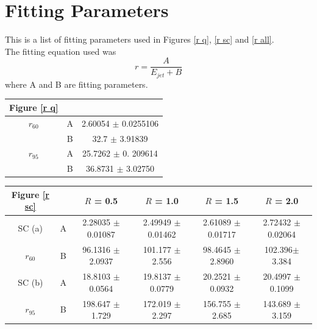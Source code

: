 \documentclass[a4paper,11pt, onecolumn]{article}
\begin{document}
  \hspace{1in}

  \newpage \newpage

  \section{Fitting Parameters} \label{fittings}


  This is a list of fitting parameters used in Figures \ref{r q}, \ref{r sc} and \ref{r all}. \\
  The fitting equation used was 
  \begin{equation}
    r = \frac{A}{E_{jet} + B}
  \end{equation}
  where A and B are fitting parameters. \\

  \begin{center}

  \begin{tabular}{|c|c||c|}
    \hline
    \textbf{Figure \ref{r q}} &&  \\
    \hline
    $r_{60}$  &A     &  2.60054 $\pm$ 0.0255106        \\
             &B     &  32.7	 $\pm$ 3.91839    \\
    \hline
    $r_{95}$  &A     &  25.7262	$\pm$ 0. 209614       \\
             &B     & 36.8731	$\pm$ 3.02750
        \\
    \hline
  \end{tabular}
  \vspace{0.7cm}


  \hspace{-1cm}
  \begin{tabular}{|c|c||c|c|c|c|}
    \hline
    \textbf{Figure \ref{r sc}}  & & $R$ = 0.5  & $R$ = 1.0 & $R$ = 1.5  & $R$ = 2.0      \\
    \hline
    SC (a)  & A & 2.28035 $\pm$ 0.01087 & 2.49949 $\pm$ 0.01462 & 2.61089 $\pm$0.01717 & 2.72432 $\pm$ 0.02064\\
    $r_{60}$ & B &96.1316 $\pm$ 2.0937 & 101.177 $\pm$ 2.556 & 98.4645 $\pm$ 2.8960 & 102.396$\pm$ 3.384 \\
    \hline
    SC (b)  & A & 18.8103 $\pm$ 0.0564 & 19.8137 $\pm$ 0.0779 & 20.2521 $\pm$ 0.0932 & 20.4997 $\pm$ 0.1099 \\
    $r_{95}$ & B & 198.647 $\pm$ 1.729 & 172.019 $\pm$ 2.297 & 156.755 $\pm$ 2.685 & 143.689 $\pm$ 3.159\\
    \hline
  \end{tabular}


\end{center}
\end{document}
